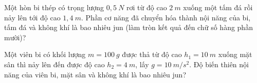 %		


\begin{ex} 
Một hòn bi thép có trọng lượng $0,5 \ N$ rơi từ độ cao $2 \ m$ xuống một tấm đá rồi nảy lên tới độ cao $1,4 \ m$. Phần cơ năng đã chuyển hóa thành nội năng của bi, tấm đá và không khí là bao nhiêu jun (làm tròn kết quả đến chữ số hàng phần mười)?
\end{ex}
\begin{ex} 
Một viên bi có khối lượng $m=100 \ g$ được thả từ độ cao $h_1=10 \ m$ xuống mặt sân thì nảy lên đến được độ cao $h_2=4 \ m$, lấy $g=10 \ m/s^2$. Độ biến thiên nội năng của viên bi, mặt sân và không khí là bao nhiêu jun?
\end{ex}

